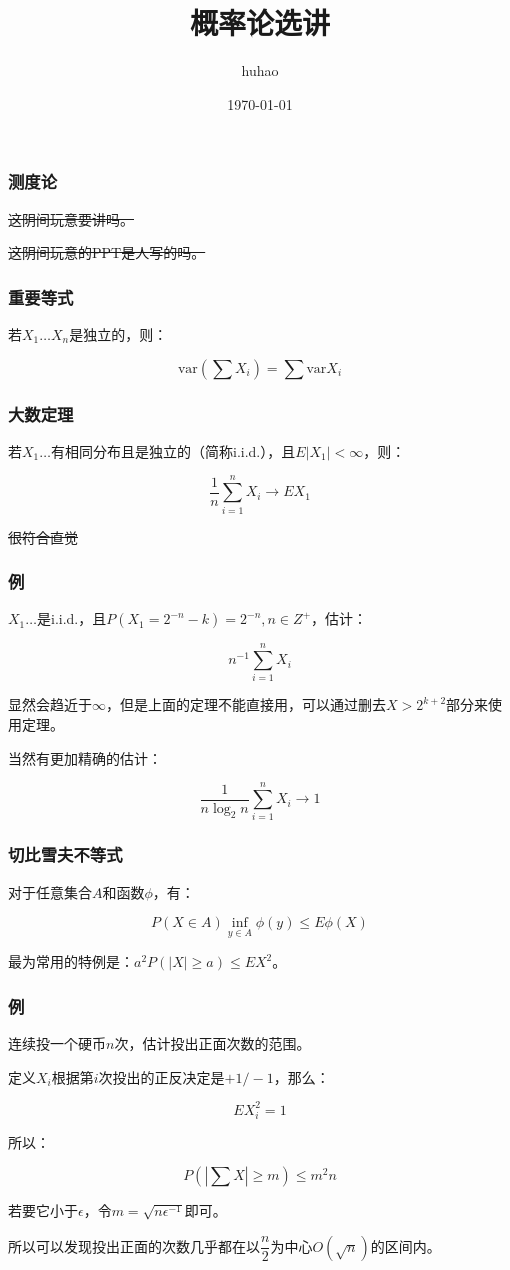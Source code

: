 \documentclass[10pt]{beamer}
\begin{document}
	\title{概率论选讲}
	\date{\today}
	\author{huhao}
	\maketitle
	\clearpage
	\begin{frame}
		\frametitle{测度论}
	
		\sout{这阴间玩意要讲吗。}

		\sout{这阴间玩意的PPT是人写的吗。}
	
	\end{frame}
	\begin{frame}
		\frametitle{重要等式}
	
		若$X_1\dots X_n$是独立的，则：

		$$
		\mathrm{var}(\sum X_i)=\sum \mathrm{var}X_i
		$$
	
	\end{frame}
	\begin{frame}
		\frametitle{大数定理}
	
		若$X_1\dots $有相同分布且是独立的（简称i.i.d.），且$E|X_1|<\infty$，则：

		$$
		\dfrac 1n\sum_{i=1}^n X_i\rightarrow EX_1
		$$

		\sout{很符合直觉}
	
	\end{frame}
	\begin{frame}
		\frametitle{例}
	
		$X_1\dots $是i.i.d.，且$P(X_1=2^{-n}-k)=2^{-n},n\in Z^+$，估计：

		$$
		n^{-1}\sum_{i=1}^n X_i
		$$


		显然会趋近于$\infty$，但是上面的定理不能直接用，可以通过删去$X>2^{k+2}$部分来使用定理。

		当然有更加精确的估计：

		$$
		\dfrac 1{n\log_2 n}\sum_{i=1}^n X_i\rightarrow 1
		$$
	
	\end{frame}
	\begin{frame}
		\frametitle{切比雪夫不等式}
	
		对于任意集合$A$和函数$\phi$，有：

		$$
		P(X\in A) \inf_{y\in A} \phi(y)\le E \phi(X)
		$$

		最为常用的特例是：$a^2P(|X|\ge a)\le EX^2$。
	
	\end{frame}
	\begin{frame}
		\frametitle{例}
	
		连续投一个硬币$n$次，估计投出正面次数的范围。

		\onslide<2->

		定义$X_i$根据第$i$次投出的正反决定是$+1/-1$，那么：

		$$
		EX_i^2=1
		$$

		所以：

		$$
		P(|\sum X|\ge m)\le m^2n
		$$

		若要它小于$\epsilon$，令$m=\sqrt{n\epsilon^{-1}}$即可。

		所以可以发现投出正面的次数几乎都在以$\dfrac n2$为中心$O(\sqrt n)$的区间内。
	
	\end{frame}
\end{document}
